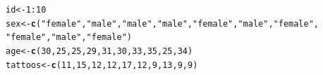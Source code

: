 \documentclass{tufte-book}\usepackage[]{graphicx}\usepackage[]{color}
\makeatletter
\newcommand{\hlnum}[1]{\textcolor[rgb]{0.686,0.059,0.569}{#1}}%
\newcommand{\hlstr}[1]{\textcolor[rgb]{0.192,0.494,0.8}{#1}}%
\newcommand{\hlopt}[1]{\textcolor[rgb]{0,0,0}{#1}}%
\newcommand{\hlstd}[1]{\textcolor[rgb]{0.345,0.345,0.345}{#1}}%
\newcommand{\hlkwb}[1]{\textcolor[rgb]{0.69,0.353,0.396}{#1}}%
\newcommand{\hlkwd}[1]{\textcolor[rgb]{0.737,0.353,0.396}{\textbf{#1}}}%
\newenvironment{kframe}{%
 \def\at@end@of@kframe{}%
 \ifinner\ifhmode%
  \def\at@end@of@kframe{\end{minipage}}%
  \begin{minipage}{\columnwidth}%
 \fi\fi%
 \def\FrameCommand##1{\hskip\@totalleftmargin \hskip-\fboxsep
 \colorbox{shadecolor}{##1}\hskip-\fboxsep
     \hskip-\linewidth \hskip-\@totalleftmargin \hskip\columnwidth}%
 \MakeFramed {\advance\hsize-\width
   \@totalleftmargin\z@ \linewidth\hsize
   \@setminipage}}%
 {\par\unskip\endMakeFramed%
 \at@end@of@kframe}
\newenvironment{knitrout}{}{} %
\makeatother
\begin{document}
\begin{knitrout}
\color{fgcolor}\begin{kframe}
\begin{alltt}
\hlstd{id} \hlkwb{<-} \hlnum{1}\hlopt{:}\hlnum{10}
\hlstd{sex} \hlkwb{<-} \hlkwd{c}\hlstd{(}\hlstr{"female"}\hlstd{,} \hlstr{"male"}\hlstd{,} \hlstr{"male"}\hlstd{,} \hlstr{"male"}\hlstd{,} \hlstr{"female"}\hlstd{,} \hlstr{"male"}\hlstd{,} \hlstr{"female"}\hlstd{,}
\hlstr{"female"}\hlstd{,} \hlstr{"male"}\hlstd{,} \hlstr{"female"}\hlstd{)}
\hlstd{age} \hlkwb{<-} \hlkwd{c}\hlstd{(}\hlnum{30}\hlstd{,} \hlnum{25}\hlstd{,} \hlnum{25}\hlstd{,} \hlnum{29}\hlstd{,} \hlnum{31}\hlstd{,} \hlnum{30}\hlstd{,} \hlnum{33}\hlstd{,} \hlnum{35}\hlstd{,} \hlnum{25}\hlstd{,} \hlnum{34}\hlstd{)}
\hlstd{tattoos} \hlkwb{<-} \hlkwd{c}\hlstd{(}\hlnum{11}\hlstd{,} \hlnum{15}\hlstd{,} \hlnum{12}\hlstd{,} \hlnum{12}\hlstd{,} \hlnum{17}\hlstd{,} \hlnum{12}\hlstd{,} \hlnum{9}\hlstd{,} \hlnum{13}\hlstd{,} \hlnum{9}\hlstd{,} \hlnum{9}\hlstd{)}
\end{alltt}
\end{kframe}
\end{knitrout}
\end{document}
